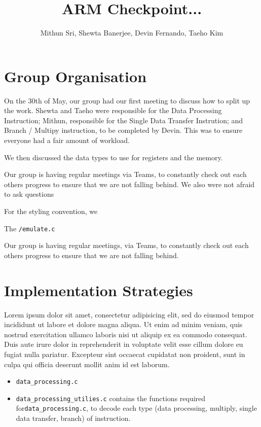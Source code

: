 \documentclass[11pt]{article}
\begin{document}
\title{ARM Checkpoint... }
\author{Mithun Sri, Shewta Banerjee, Devin Fernando, Taeho Kim}

\maketitle



\section{Group Organisation}

On the 30th of May, our group had our first meeting to discuss how to split up the work. Shewta and Taeho were responsible for the Data Processing Instruction; Mithun, responsible for the Single Data Transfer Instrution; and Branch / Multipy instruction, to be completed by Devin. This was to ensure everyone had a fair amount of workload. 

We then discussed the data types to use for registers and the memory.

Our group is having regular meetings via Teams, to constantly check out each others progress to ensure that we are not falling behind. We also were not afraid to ask questions

For the styling convention, we 


The \texttt{/emulate.c} 

Our group is having regular meetings, via Teams, to constantly check out each others progress to ensure that we are not falling behind. 

\section{Implementation Strategies}

Lorem ipsum dolor sit amet, consectetur adipisicing elit, sed do eiusmod tempor
incididunt ut labore et dolore magna aliqua. Ut enim ad minim veniam, quis
nostrud exercitation ullamco laboris nisi ut aliquip ex ea commodo consequat.
Duis aute irure dolor in reprehenderit in voluptate velit esse cillum dolore eu
fugiat nulla pariatur. Excepteur sint occaecat cupidatat non proident, sunt in
culpa qui officia deserunt mollit anim id est laborum.



\begin{itemize}
\item \texttt{data_processing.c}
\item \texttt{data_processing_utilies.c} contains the functions required for\texttt{data_processing.c}, to decode each type (data processing, multiply, single data transfer, branch) of instruction.
\end{itemize}
\end{document}
